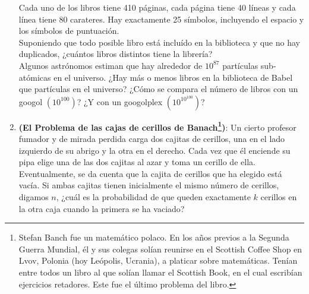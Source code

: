 \documentclass{article}
\begin{document}
\begin{enumerate}
    Cada uno de los libros tiene 410 páginas, cada página tiene 40 líneas y cada línea tiene 80 carateres. 
    Hay exactamente 25 símbolos, incluyendo el espacio y los símbolos de puntuación. \\

    Suponiendo que todo posible libro está incluído en la biblioteca y que no hay duplicados, ¿cuántos libros 
    distintos tiene la librería?\\

    Algunos astrónomos estiman que hay alrededor de $10^{87}$ partículas sub-atómicas en el universo.
    ¿Hay más o menos libros en la biblioteca de Babel que partículas en el universo? ¿Cómo se compara el número 
    de libros con un googol $\left(10^{100}\right)$? ¿Y con un googolplex $\left(10^{10^{100}}\right)$?

    \item \textbf{(El Problema de las cajas de cerillos de Banach\footnote[1]{Stefan Banch fue un matemático polaco. En los años previos a la Segunda 
    Guerra Mundial, él y sus colegas solían reunirse en el Scottish Coffee Shop en Lvov, Polonia (hoy Leópolis, Ucrania), a platicar sobre matemáticas.
    Tenían entre todos un libro al que solían llamar el Scottish Book, en el cual escribían ejercicios retadores. Este fue el último 
    problema del libro.})}: Un cierto profesor fumador y de mirada perdida 
    carga dos cajitas de cerillos, una en el lado izquierdo de su abrigo y la otra en el derecho. Cada vez 
    que él enciende su pipa elige una de las dos cajitas al azar y toma un cerillo de ella. Eventualmente, se 
    da cuenta que la cajita de cerillos que ha elegido está vacía. Si ambas cajitas tienen inicialmente el mismo número 
    de cerillos, digamos $n$, ¿cuál es la probabilidad de que queden exactamente $k$ cerillos en la otra caja 
    cuando la primera se ha vaciado?
   

\end{enumerate}
\end{document}
